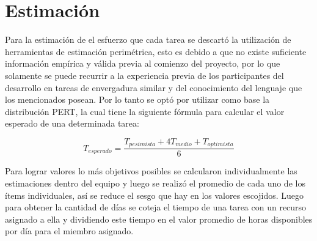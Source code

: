 \section{Estimación}

Para la estimación de el esfuerzo que cada tarea se descartó la utilización de herramientas de estimación perimétrica, esto es debido a que no existe suficiente información empírica y válida previa al comienzo del proyecto, por lo que solamente se puede recurrir a la experiencia previa de los participantes del desarrollo en tareas de envergadura similar y del conocimiento del lenguaje que los mencionados posean.
Por lo tanto se optó por utilizar como base la distribución PERT, la cual tiene la siguiente fórmula para calcular el valor esperado de una determinada tarea:

\[
    T_{esperado} = \frac{T_{pesimista} + 4T_{medio} + T_{optimista}}{6}
\]

Para lograr valores lo más objetivos posibles se calcularon individualmente las estimaciones dentro del equipo y luego se realizó el promedio de cada uno de los ítems individuales, así se reduce el sesgo que hay en los valores escojidos. Luego para obtener la cantidad de días se coteja el tiempo de una tarea con un recurso asignado a ella y dividiendo este tiempo en el valor promedio de horas disponibles por día para el miembro asignado.


